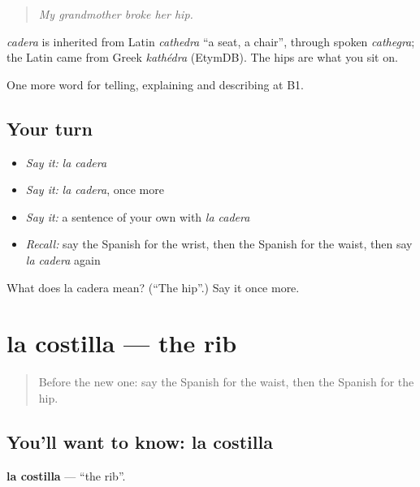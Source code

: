 \begin{quote}
\emph{My grandmother broke her hip.}
\end{quote}

\begin{cousinweb}
\emph{cadera} is inherited from Latin \emph{cathedra} \textquotedblleft{}a seat, a chair\textquotedblright{}, through spoken \emph{cathegra}; the Latin came from Greek \emph{kathédra} (EtymDB). The hips are what you sit on.
\end{cousinweb}

\begin{grammarlens}[title={What you've built}]
One more word for telling, explaining and describing at B1.
\end{grammarlens}

\subsection*{Your turn}
\begin{itemize}
\raggedright
  \item \emph{Say it:} \emph{la cadera}
  \item \emph{Say it:} \emph{la cadera}, once more
  \item \emph{Say it:} a sentence of your own with \emph{la cadera}
  \item \emph{Recall:} say the Spanish for the wrist, then the Spanish for the waist, then say \emph{la cadera} again
\end{itemize}

\begin{tcolorbox}[breakable,colback=teal!4,colframe=teal!35!black,title={Before you move on}]
What does la cadera mean? (\textquotedblleft{}The hip\textquotedblright{}.) Say it once more.
\end{tcolorbox}
\section[la costilla]{la costilla — the rib}

\label{lesson:ES-C737-costilla}



\begin{quote}
Before the new one: say the Spanish for the waist, then the Spanish for the hip.
\end{quote}

\subsection*{You'll want to know: la costilla}
\textbf{la costilla} — \textquotedblleft{}the rib\textquotedblright{}.

